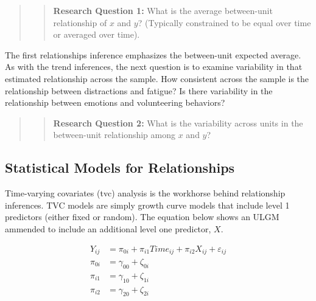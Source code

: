 \documentclass[english,,man]{apa6}
\theoremstyle{definition}
\theoremstyle{definition}
\theoremstyle{definition}
\theoremstyle{remark}
\begin{document}
\begin{quote}
\begin{quote}
\textbf{Research Question 1:} What is the average between-unit
relationship of \(x\) and \(y\)? (Typically constrained to be equal over
time or averaged over time).
\end{quote}
\end{quote}

The first relationships inference emphasizes the between-unit expected
average. As with the trend inferences, the next question is to examine
variability in that estimated relationship across the sample. How
consistent across the sample is the relationship between distractions
and fatigue? Is there variability in the relationship between emotions
and volunteering behaviors?

\begin{quote}
\begin{quote}
\textbf{Research Question 2:} What is the variability across units in
the between-unit relationship among \(x\) and \(y\)?
\end{quote}
\end{quote}

\hypertarget{statistical-models-for-relationships}{%
\subsection{Statistical Models for
Relationships}\label{statistical-models-for-relationships}}

Time-varying covariates (tvc) analysis is the workhorse behind
relationship inferences. TVC models are simply growth curve models that
include level 1 predictors (either fixed or random). The equation below
shows an ULGM ammended to include an additional level one predictor,
\(X\).

\begin{align}
\label{ULGM}
Y_{ij} &= \pi_{0i} + \pi_{i1}Time_{ij} + \pi_{i2}X_{ij} + \varepsilon_{ij} \\
\pi_{0i} &= \gamma_{00} + \zeta_{0i} \\
\pi_{i1} &= \gamma_{10} + \zeta_{1i} \\
\pi_{i2} &= \gamma_{20} + \zeta_{2i}
\end{align}
\end{document}
